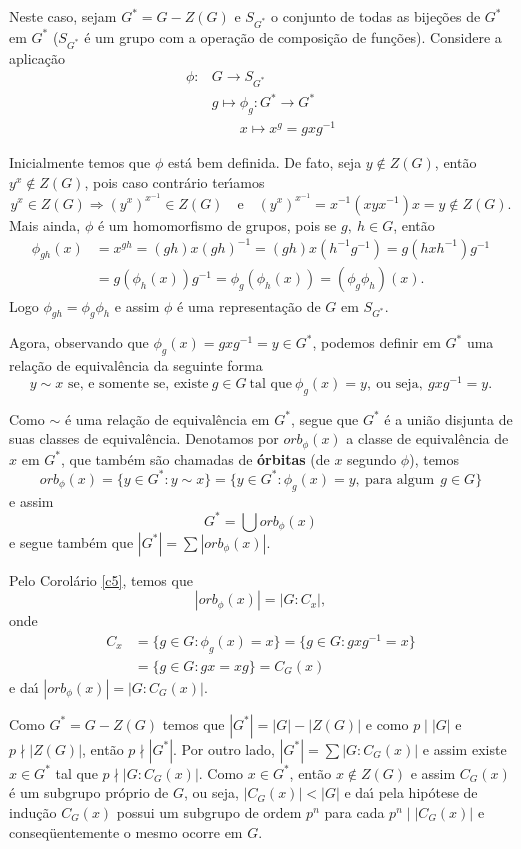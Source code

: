 \begin{prova}
Neste caso, sejam $G^* = G - Z(G)$ e $S_{G^*}$ o conjunto de todas as
bije{\c c}{\~o}es de $G^*$ em $G^*$ ($S_{G^*}$ {\'e} um grupo com a opera{\c
c}{\~a}o de composi{\c c}{\~a}o de fun{\c c}{\~o}es). Considere a
aplica{\c c}{\~a}o
\begin{align*}
\phi : & G \to S_{G^*}\\
&g \mapsto \phi_g : G^* \to G^*\\
&\qquad x \mapsto x^g = gxg^{-1}
\end{align*}

Inicialmente temos que $\phi$ est{\'a} bem definida. De fato, seja $y \notin
Z(G)$, ent{\~a}o $y^x \notin Z(G)$, pois caso contr{\'a}rio
ter{\'\i}amos
\[
y^x \in Z(G) \Rightarrow (y^x)^{x^{-1}} \in Z(G) \quad
\text{e}\quad (y^x)^{x^{-1}} = x^{-1}(xyx^{-1})x = y \notin Z(G).
\]
Mais ainda, $\phi$ {\'e} um homomorfismo de grupos, pois se $g,\ h \in G$,
ent{\~a}o 
\begin{align*}
\phi_{gh} (x) &= x^{gh} =
(gh)x(gh)^{-1} = (gh)x(h^{-1}g^{-1}) = g(hxh^{-1})g^{-1} \\&=
g(\phi_h (x))g^{-1} = \phi_g (\phi_h (x)) = (\phi_g \phi_h)(x).
\end{align*}
Logo $\phi_{gh} = \phi_g \phi_h$ e assim $\phi$ {\'e} uma representa{\c
  c}{\~a}o de $G$ em $S_{G^*}$.

Agora, observando que $\phi_g(x) = gxg^{-1} = y \in G^*$, podemos definir em
$G^*$ uma rela{\c c}{\~a}o de equival{\^e}ncia da seguinte forma
\[
y \sim x \mbox{ se, e somente se, existe}\ g \in G\ \mbox{tal que}\ \phi_g (x) = y,\
\text{ou seja},\ gxg^{-1} = y.
\]

Como $\sim$ {\'e} uma rela{\c c}{\~a}o de equival{\^e}ncia em $G^*$, segue
que $G^*$ {\'e} a uni{\~a}o disjunta de suas classes de
equival{\^e}ncia. Denotamos por $orb_\phi (x)$ a classe de equival{\^e}ncia
de $x$ em $G^*$, que tamb{\'e}m s{\~a}o chamadas de \textbf{{\'o}rbitas} (de
$x$ segundo $\phi$), temos
\[
orb_\phi (x) = \{y \in G^* : y \sim x \} = \{y
\in G^* : \phi_g (x) = y,\ \mbox{para algum}\ \ g \in G \}
\]
e assim 
\[
G^* = \bigcup orb_\phi (x)
\] e segue tamb{\'e}m que $|G^*| = \sum |orb_\phi
(x)|$.

Pelo Corol{\'a}rio \ref{c5}, temos que
\[
|orb_\phi (x)| = |G : C_x|,
\]
onde
\begin{align*}
C_x &= \{g \in G : \phi_g (x) = x \} = \{g \in G
: gxg^{-1} = x \} \\
&= \{g \in G : gx = xg \} = C_G (x)
\end{align*}
e da{\'\i} $|orb_\phi (x)| = |G : C_G (x)|$.

Como $G^* = G - Z(G)$ temos que $|G^*| = |G| - |Z(G)|$ e como $p \mid |G|$ e
$p \nmid |Z(G)|$, ent{\~a}o $p \nmid |G^*|$. Por outro lado, $|G^*| = \sum
|G : C_G(x)|$ e assim existe $x \in G^*$ tal que $p \nmid |G :
C_G(x)|$. Como $x \in G^*$, ent{\~a}o $x \notin Z(G)$ e assim $C_G(x)$ {\'e}
um subgrupo pr{\'o}prio de $G$, ou seja, $|C_G(x)| < |G|$ e da{\'\i} pela
hip{\'o}tese de indu{\c c}{\~a}o $C_G(x)$ possui um subgrupo de ordem $p^n$
para cada $p^n \mid |C_G(x)|$ e conseq{\"u}entemente o mesmo ocorre em $G$.
\end{prova}

